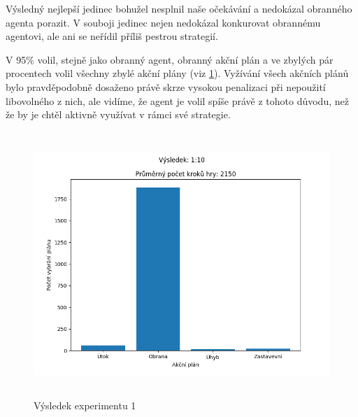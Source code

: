 Výsledný nejlepší jedinec bohužel nesplnil naše očekávání a nedokázal obranného agenta porazit. 
V souboji jedinec nejen nedokázal konkurovat obrannému agentovi, ale ani se neřídil příliš pestrou strategií.

V 95\% volil, stejně jako obranný agent, obranný akční plán a ve zbylých pár procentech volil všechny zbylé akční plány (viz \ref{Výsledek experimentu 01}).
Vyžívání všech akčních plánů bylo pravděpodobně dosaženo právě skrze vysokou penalizaci při nepoužití libovolného z nich, ale vidíme, že agent je volil spíše právě z tohoto důvodu, než že by je chtěl aktivně využívat v rámci své strategie.

\begin{figure}[H]\centering
\includegraphics[width=125mm, height=100mm]{./Obrazky/Experiment01Results.png}
\caption{Výsledek experimentu 1}
\label{Výsledek experimentu 01}
\end{figure}



\newpage
